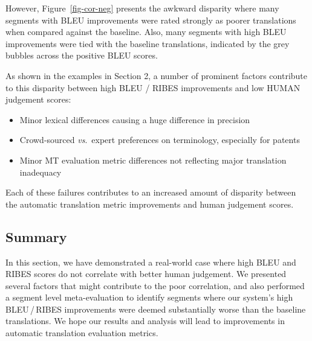 However, Figure~\ref{fig-cor-neg} presents the awkward disparity where many segments with BLEU improvements were rated strongly as poorer translations when compared against the baseline. Also, many segments with high BLEU improvements were tied with the baseline translations, indicated by the grey bubbles across the positive BLEU scores.

As shown in the examples in Section 2, a number of prominent factors contribute to this disparity between high BLEU / RIBES improvements and low HUMAN judgement scores:
\begin{itemize}
	\item Minor lexical differences causing a huge difference in \ngram{} precision
	\item Crowd-sourced \textit{vs}.\ expert preferences on terminology, especially for patents
	\item Minor MT evaluation metric differences not reflecting major translation inadequacy
\end{itemize}

Each of these failures contributes to an increased amount of disparity between the automatic translation metric improvements and human judgement scores.

\subsection{Summary}

In this section, we have demonstrated a real-world case where high BLEU and RIBES scores do not correlate with better human judgement. We presented several factors that might contribute to the poor correlation, and also performed a segment level meta-evaluation to identify segments where our system's high BLEU\,/\,RIBES improvements were deemed substantially worse than the baseline translations. 
We hope our results and analysis will lead to improvements in automatic translation evaluation metrics. 